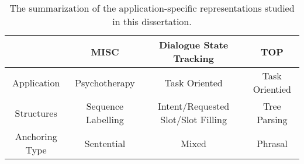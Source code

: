 \begin{table}[!tbp]
\caption{The summarization of the application-specific representations studied in this dissertation.}
\label{tbl:bg:app-rep}
  \begin{center}
\setlength{\tabcolsep}{3pt}
{\small
\begin{tabular}{c|c|c|c}
  \toprule
  \hline
  & {\bf MISC}               & {\bf Dialogue State Tracking}            & {\bf TOP}            \\ \hline
  Application    & Psychotherapy      & Task Oriented                      & Task Orientied \\
  Structures     & Sequence Labelling & Intent/Requested Slot/Slot Filling & Tree Parsing   \\
  Anchoring Type & Sentential         & Mixed                              & Phrasal        \\
  \hline
  \bottomrule

\end{tabular}}
\end{center}
\label{tbl:bg:app-rep}
\end{table}



